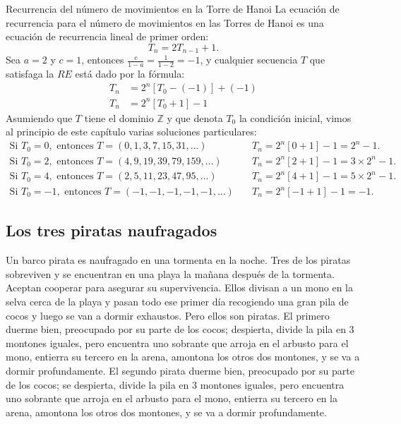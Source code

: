 \begin{example}{Recurrencia del número de movimientos en la Torre de Hanoi}
	La ecuación de recurrencia para el número de movimientos en las Torres de Hanoi es una ecuación de recurrencia lineal de primer orden:
	\begin{equation*}
	T_{n}=2T_{n-1}+1.
	\end{equation*}
	Sea $a=2$ y $c=1$, entonces $\frac{c}{1-a}=\frac{1}{1-2}=-1$, y cualquier secuencia $T$ que satisfaga la $RE$ está dado por la fórmula:
	\begin{align*}
	T_{n}&=2^{n}\left[T_{0}-(-1)\right]+(-1)\\
	T_{n}&=2^{n}\left[T_{0}+1\right]-1
	\end{align*}
	Asumiendo que $T$ tiene el dominio $\mathds{Z}$ y que denota $T_0$ la condición inicial, vimos al principio de este capítulo varias soluciones particulares:
	\begin{align*}
		\text{Si }T_{0}=0,\text{ entonces }T=\left(0,1,3,7,15,31,\ldots\right)\quad &T_{n}=2^{n}[0+1]-1=2^n-1.\\
		\text{Si }T_{0}=2,\text{ entonces }T=\left(4,9,19,39,79,159,\ldots\right)\quad &T_{n}=2^{n}[2+1]-1=3\times2^{n}-1.\\
		\text{Si }T_{0}=4,\text{ entonces }T=\left(2,5,11,23,47,95,\ldots\right)\quad &T_{n}=2^{n}[4+1]-1=5\times2^{n}-1.\\
		\text{Si }T_{0}=-1,\text{ entonces }T=\left(-1,-1,-1,-1,-1,\ldots\right)\quad &T_{n}=2^{n}\left[-1+1\right]-1=-1.
	\end{align*}
\end{example}

\subsection{Los tres piratas naufragados}

Un barco pirata es naufragado en una tormenta en la noche. Tres de los piratas sobreviven y se encuentran en una playa la mañana después de la tormenta. Aceptan cooperar para asegurar su supervivencia. Ellos divisan a un mono en la selva cerca de la playa y pasan todo ese primer día recogiendo una gran pila de cocos y luego se van a dormir exhaustos. Pero ellos son piratas. El primero duerme bien, preocupado por su parte de los cocos; despierta, divide la pila en 3 montones iguales, pero encuentra uno sobrante que arroja en el arbusto para el mono, entierra su tercero en la arena, amontona los otros dos montones, y se va a dormir profundamente. El segundo pirata duerme bien, preocupado por su parte de los cocos; se despierta, divide la pila en 3 montones iguales, pero encuentra uno sobrante que arroja en el arbusto para el mono, entierra su tercero en la arena, amontona los otros dos montones, y se va a dormir profundamente.

